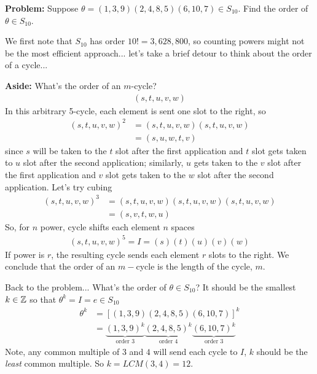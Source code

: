 \begin{example}
\textbf{Problem:} Suppose $\theta = (1,3,9)(2,4,8,5)(6,10,7)\in S_{10}$. Find the order of
$\theta \in S_{10}$. \steezybreak

\noindent We first note that $S_{10}$ has order $10!=3,628,800$, so counting powers might not be the
most efficient approach... let's take a brief detour to think about the order of a cycle...
\steezybreak

\noindent \textbf{Aside:} What's the order of an $m$-cycle?
\begin{align}
    (s,t,u,v,w) \nonumber
\end{align}
In this arbitrary 5-cycle, each element is sent one slot to the right, so
\begin{align}
    (s,t,u,v,w)^2 &= (s,t,u,v,w)(s,t,u,v,w)\nonumber \\
    &= (s,u,w,t,v) \nonumber
\end{align}
since $s$ will be taken to the $t$ slot after the first application and $t$ slot gets taken to $u$
slot after the second application; similarly, $u$ gets taken to the $v$ slot after the first
application and $v$ slot gets taken to the $w$ slot after the second application. Let's try cubing
\begin{align}
    (s,t,u,v,w)^3&=(s,t,u,v,w)(s,t,u,v,w)(s,t,u,v,w) \nonumber \\
    &= (s,v,t,w,u) \nonumber
\end{align}
So, for $n$ power, cycle shifts each element $n$ spaces
\begin{align}
    (s,t,u,v,w)^5=I=(s)(t)(u)(v)(w)\nonumber
\end{align}
If power is $r$, the resulting cycle sends each element $r$ slots to the right. We conclude that the
order of an $m-$cycle is the length of the cycle, $m$. \steezybreak

\noindent Back to the problem... What's the order of $\theta \in S_{10}$? It should be the smallest
$k\in {\mathbb{Z}}$ so that $\theta^k= I = e \in S_{10}$
\begin{align}
    \theta^k&=[(1,3,9)(2,4,8,5)(6,10,7)]^k \nonumber \\
    &= \underbrace{(1,3,9)^k}_{\text{order }3}\underbrace{(2,4,8,5)^k}_{\text{order }4}\underbrace{(6,10,7)^k}_{\text{order }3} \nonumber
\end{align}
Note, any common multiple of $3$ and $4$ will send each cycle to $I$, $k$ should be the
\textit{least} common multiple. So $k=LCM(3,4)=12$.
\end{example}

